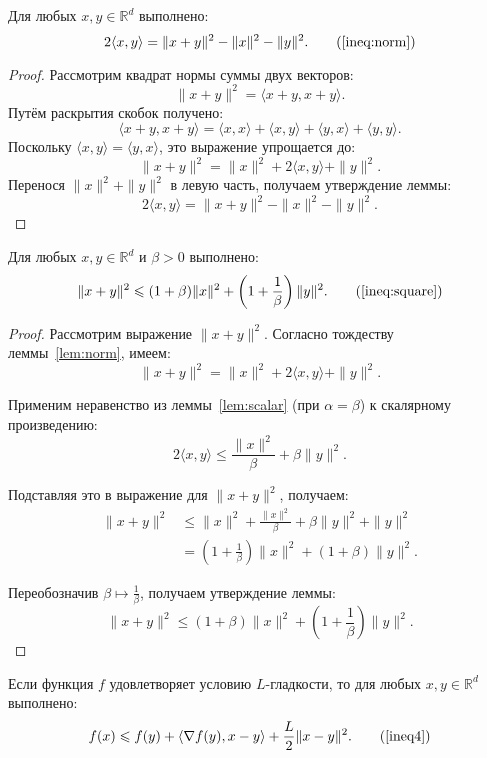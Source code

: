\begin{lemma}\label{lem:norm}
Для любых \(x, y \in \mathbb{R}^d\) выполнено:
\[
2\langle x, y \rangle = \|x + y\|^2 - \|x\|^2 - \|y\|^2. \tag{\ref{ineq:norm}}
\]
\end{lemma}

\begin{proof}
Рассмотрим квадрат нормы суммы двух векторов:
\[
\|x + y\|^2 = \langle x + y, x + y \rangle.
\]
Путём раскрытия скобок получено:
\[
\langle x + y, x + y \rangle = \langle x, x \rangle + \langle x, y \rangle + \langle y, x \rangle + \langle y, y \rangle.
\]
Поскольку \(\langle x, y \rangle = \langle y, x \rangle\), это выражение упрощается до:
\[
\|x + y\|^2 = \|x\|^2 + 2\langle x, y \rangle + \|y\|^2.
\]
Перенося \(\|x\|^2 + \|y\|^2\) в левую часть, получаем утверждение леммы:
\[
2\langle x, y \rangle = \|x + y\|^2 - \|x\|^2 - \|y\|^2.
\]
\end{proof}


\begin{lemma}\label{lem:quadratic}
Для любых \(x, y \in \mathbb{R}^d\) и \(\beta > 0\) выполнено:
\[
\|x + y\|^2 \leqslant (1 + \beta)\|x\|^2 + \left(1 + \frac{1}{\beta}\right)\|y\|^2. \tag{\ref{ineq:square}}
\]
\end{lemma}

\begin{proof}
Рассмотрим выражение \(\|x + y\|^2\). Согласно тождеству леммы~\ref{lem:norm}, имеем:
\[
\|x + y\|^2 = \|x\|^2 + 2\langle x, y \rangle + \|y\|^2.
\]

Применим неравенство из леммы~\ref{lem:scalar} (при \(\alpha = \beta\)) к скалярному произведению:
\[
2\langle x, y \rangle \leqslant \frac{\|x\|^2}{\beta} + \beta \|y\|^2.
\]

Подставляя это в выражение для \(\|x + y\|^2\), получаем:
\begin{align*}
\|x + y\|^2 &\leqslant \|x\|^2 + \frac{\|x\|^2}{\beta} + \beta \|y\|^2 + \|y\|^2 \\
&= \left(1 + \frac{1}{\beta}\right)\|x\|^2 + (1 + \beta)\|y\|^2.
\end{align*}

Переобозначив \(\beta \mapsto \frac{1}{\beta}\), получаем утверждение леммы:
\[
\|x + y\|^2 \leqslant (1 + \beta)\|x\|^2 + \left(1 + \frac{1}{\beta}\right)\|y\|^2.
\]
\end{proof}


\begin{lemma}\label{lem:smoothness}
Если функция \(f\) удовлетворяет условию \(L\)-гладкости, то для любых \(x, y \in \mathbb{R}^d\) выполнено:
\[
f(x) \leqslant f(y) + \langle \nabla f(y), x - y \rangle + \frac{L}{2} \|x - y\|^2. \tag{\ref{ineq4}}
\]
\end{lemma}

